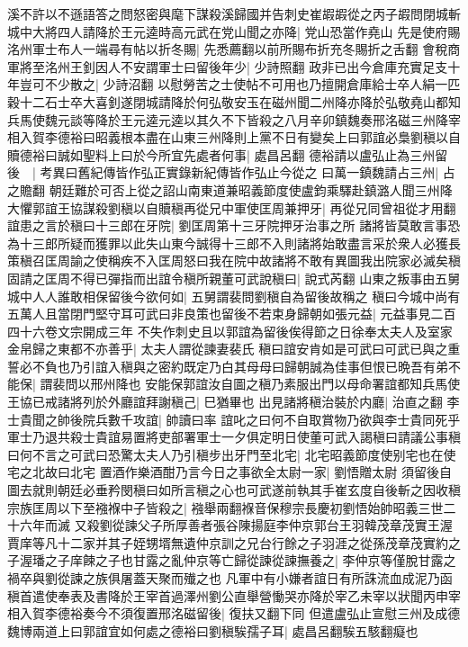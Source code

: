 溪不許以不遜語答之問怒密與麾下謀殺溪歸國并告刺史崔嘏嘏從之丙子嘏問閉城斬城中大將四人請降於王元逵時高元武在党山聞之亦降|{
	党山恐當作堯山}
先是使府賜洺州軍士布人一端尋有帖以折冬賜|{
	先悉薦翻以前所賜布折充冬賜折之舌翻}
會稅商軍將至洺州王釗因人不安謂軍士曰留後年少|{
	少詩照翻}
政非已出今倉庫充實足支十年豈可不少散之|{
	少詩沼翻}
以慰勞苦之士使帖不可用也乃擅開倉庫給士卒人絹一匹穀十二石士卒大喜釗遂閉城請降於何弘敬安玉在磁州聞二州降亦降於弘敬堯山都知兵馬使魏元談等降於王元逵元逵以其久不下皆殺之八月辛卯鎮魏奏邢洺磁三州降宰相入賀李德裕曰昭義根本盡在山東三州降則上黨不日有變矣上曰郭誼必梟劉稹以自贖德裕曰誠如聖料上曰於今所宜先處者何事|{
	處昌呂翻}
德裕請以盧弘止為三州留後　|{
	考異曰舊紀傳皆作弘正實錄新紀傳皆作弘止今從之}
曰萬一鎮魏請占三州|{
	占之贍翻}
朝廷難於可否上從之詔山南東道兼昭義節度使盧鈞乘驛赴鎮潞人聞三州降大懼郭誼王協謀殺劉稹以自贖稹再從兄中軍使匡周兼押牙|{
	再從兄同曾祖從才用翻}
誼患之言於稹曰十三郎在牙院|{
	劉匡周第十三牙院押牙治事之所}
諸將皆莫敢言事恐為十三郎所疑而獲罪以此失山東今誠得十三郎不入則諸將始敢盡言采於衆人必獲長策稹召匡周諭之使稱疾不入匡周怒曰我在院中故諸將不敢有異圖我出院家必滅矣稹固請之匡周不得已彈指而出誼令稹所親董可武說稹曰|{
	說式芮翻}
山東之叛事由五舅城中人人誰敢相保留後今欲何如|{
	五舅謂裴問劉稹自為留後故稱之}
稹曰今城中尚有五萬人且當閉門堅守耳可武曰非良策也留後不若束身歸朝如張元益|{
	元益事見二百四十六卷文宗開成三年}
不失作刺史且以郭誼為留後俟得節之日徐奉太夫人及室家金帛歸之東都不亦善乎|{
	太夫人謂從諫妻裴氏}
稹曰誼安肯如是可武曰可武已與之重誓必不負也乃引誼入稹與之密約既定乃白其母母曰歸朝誠為佳事但恨已晩吾有弟不能保|{
	謂裴問以邢州降也}
安能保郭誼汝自圖之稹乃素服出門以母命署誼都知兵馬使王協已戒諸將列於外廳誼拜謝稹己|{
	巳猶畢也}
出見諸將稹治裝於内廳|{
	治直之翻}
李士貴聞之帥後院兵數千攻誼|{
	帥讀曰率}
誼叱之曰何不自取賞物乃欲與李士貴同死乎軍士乃退共殺士貴誼易置將吏部署軍士一夕俱定明日使董可武入謁稹曰請議公事稹曰何不言之可武曰恐驚太夫人乃引稹步出牙門至北宅|{
	北宅昭義節度使别宅也在使宅之北故曰北宅}
置酒作樂酒酣乃言今日之事欲全太尉一家|{
	劉悟贈太尉}
須留後自圖去就則朝廷必垂矜閔稹曰如所言稹之心也可武遂前執其手崔玄度自後斬之因收稹宗族匡周以下至襁褓中子皆殺之|{
	襁舉兩翻褓音保穆宗長慶初劉悟始帥昭義三世二十六年而滅}
又殺劉從諫父子所厚善者張谷陳揚庭李仲京郭台王羽韓茂章茂實王渥賈庠等凡十二家并其子姪甥壻無遺仲京訓之兄台行餘之子羽涯之從孫茂章茂實約之子渥璠之子庠餗之子也甘露之亂仲京等亡歸從諫從諫撫養之|{
	李仲京等僅脫甘露之禍卒與劉從諫之族俱屠蓋天聚而殱之也}
凡軍中有小嫌者誼日有所誅流血成泥乃函稹首遣使奉表及書降於王宰首過澤州劉公直舉營慟哭亦降於宰乙未宰以狀聞丙申宰相入賀李德裕奏今不須復置邢洺磁留後|{
	復扶又翻下同}
但遣盧弘止宣慰三州及成德魏博兩道上曰郭誼宜如何處之德裕曰劉稹騃孺子耳|{
	處昌呂翻騃五駭翻癡也}
